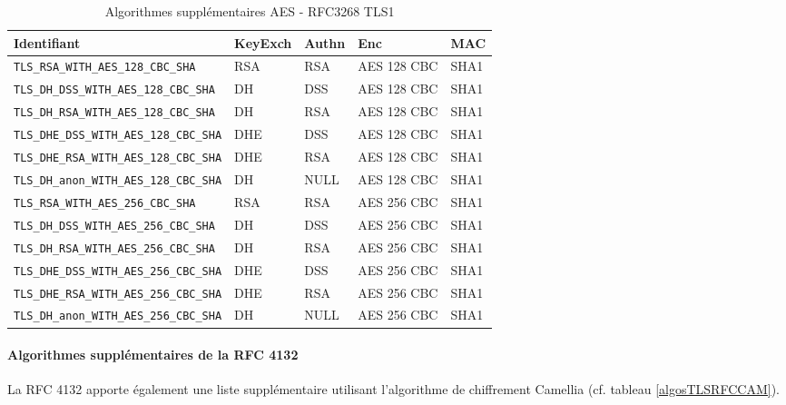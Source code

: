 \begin{table}[H]
\centering
\begin{tabularx}{17cm}{|l|l|l|X|l|}
\hline
\textbf{Identifiant} & \textbf{KeyExch} & \textbf{Authn}& \textbf{Enc}& \textbf{MAC}\\
\hline
\verb+TLS_RSA_WITH_AES_128_CBC_SHA+&RSA&RSA&AES 128 CBC&SHA1\\
\hline
\verb+TLS_DH_DSS_WITH_AES_128_CBC_SHA+&DH&DSS&AES 128 CBC&SHA1\\
\hline 
\verb+TLS_DH_RSA_WITH_AES_128_CBC_SHA+&DH&RSA&AES 128 CBC&SHA1\\
\hline 
\verb+TLS_DHE_DSS_WITH_AES_128_CBC_SHA+&DHE&DSS&AES 128 CBC&SHA1\\
\hline
\verb+TLS_DHE_RSA_WITH_AES_128_CBC_SHA+&DHE&RSA&AES 128 CBC&SHA1\\
\hline
\verb+TLS_DH_anon_WITH_AES_128_CBC_SHA+ &DH&NULL&AES 128 CBC&SHA1\\
\hline
\verb+TLS_RSA_WITH_AES_256_CBC_SHA+&RSA&RSA&AES 256 CBC&SHA1 \\
\hline
\verb+TLS_DH_DSS_WITH_AES_256_CBC_SHA+& DH&DSS&AES 256 CBC&SHA1\\
\hline
\verb+TLS_DH_RSA_WITH_AES_256_CBC_SHA+&DH&RSA&AES 256 CBC&SHA1\\
\hline
\verb+TLS_DHE_DSS_WITH_AES_256_CBC_SHA+& DHE&DSS&AES 256 CBC&SHA1\\
\hline
\verb+TLS_DHE_RSA_WITH_AES_256_CBC_SHA+& DHE&RSA&AES 256 CBC&SHA1\\
\hline
\verb+TLS_DH_anon_WITH_AES_256_CBC_SHA+& DH&NULL&AES 256 CBC&SHA1\\
\hline
\end{tabularx}
\caption{Algorithmes supplémentaires AES - RFC3268 TLS1}
\label{algosTLSRFCAES}
\end{table}

\paragraph{Algorithmes supplémentaires de la RFC 4132} 
La RFC 4132 \cite{rfc4132} apporte également une liste supplémentaire utilisant l'algorithme de chiffrement Camellia (cf. tableau \ref{algosTLSRFCCAM}).


